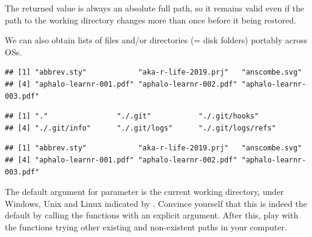 \documentclass[krantz2]{krantz}\usepackage{knitr}%
\begin{document}
The returned value is always an absolute full path, so it remains valid even if the path to the working directory changes more than once before it being restored.
\begin{knitrout}\footnotesize
{}\color{fgcolor}\begin{kframe}
\begin{alltt}
\hlstd{()}
\end{alltt}
\end{kframe}
\end{knitrout}

We can also obtain lists of files and/or directories (= disk folders) portably across OSs.
\begin{knitrout}\footnotesize
{}\color{fgcolor}\begin{kframe}
\begin{alltt}
\hlstd{(}\hlstd{())}
\end{alltt}
\begin{verbatim}
## [1] "abbrev.sty"            "aka-r-life-2019.prj"   "anscombe.svg"         
## [4] "aphalo-learnr-001.pdf" "aphalo-learnr-002.pdf" "aphalo-learnr-003.pdf"
\end{verbatim}
\begin{alltt}
\hlstd{(}\hlstd{())}
\end{alltt}
\begin{verbatim}
## [1] "."                "./.git"           "./.git/hooks"    
## [4] "./.git/info"      "./.git/logs"      "./.git/logs/refs"
\end{verbatim}
\begin{alltt}
\hlstd{(}\hlstd{())}
\end{alltt}
\begin{verbatim}
## [1] "abbrev.sty"            "aka-r-life-2019.prj"   "anscombe.svg"         
## [4] "aphalo-learnr-001.pdf" "aphalo-learnr-002.pdf" "aphalo-learnr-003.pdf"
\end{verbatim}
\end{kframe}
\end{knitrout}

\begin{playground}
The default argument for parameter  is the current working directory, under Windows, Unix and Linux indicated by  . Convince yourself that this is indeed the default by calling the functions with an explicit argument. After this, play with the functions trying other existing and non-existent paths in your computer.
\end{playground}
\end{document}
